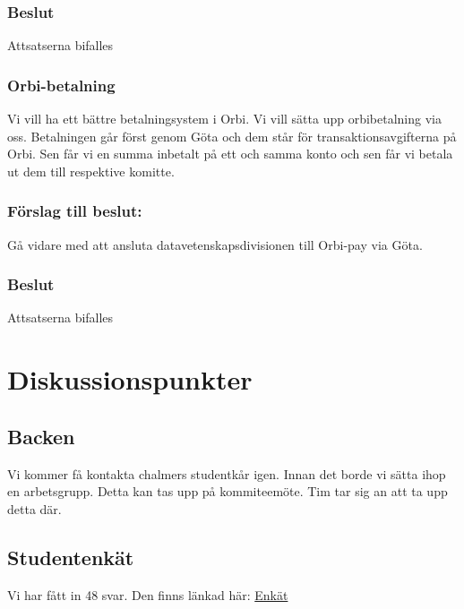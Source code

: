 \documentclass[protokoll]{dvd}
\begin{document}
\subsubsection*{Beslut}
\begin{attsatser}
    \item Attsatserna bifalles
\end{attsatser}

\subsubsection*{Orbi-betalning}
Vi vill ha ett bättre betalningsystem i Orbi. Vi vill sätta upp orbibetalning via oss.
Betalningen går först genom Göta och dem står för transaktionsavgifterna på Orbi. 
Sen får vi en summa inbetalt på ett och samma konto och sen får vi betala ut dem till respektive komitte.

\subsubsection*{Förslag till beslut:}
\begin{attsatser}
    \item Gå vidare med att ansluta datavetenskapsdivisionen till Orbi-pay via Göta.
\end{attsatser}

\subsubsection*{Beslut}
\begin{attsatser}
    \item Attsatserna bifalles
\end{attsatser}


\section{Diskussionspunkter}

\subsection*{Backen}
Vi kommer få kontakta chalmers studentkår igen. Innan det borde vi sätta ihop en arbetsgrupp.
Detta kan tas upp på kommiteemöte. Tim tar sig an att ta upp detta där.

\subsection*{Studentenkät}
Vi har fått in 48 svar.
Den finns länkad här:
\href{https://drive.google.com/file/d/1CCt1Z3ZoE3Ne9fgUs6aXHUFfAUod3lLN/view?usp=drive_link}{Enkät}
\end{document}

